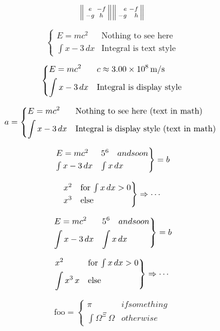 \documentclass{article}
\newcommand{\horz}{\noindent\makebox[\linewidth]{\rule{\paperwidth}{0.4pt}}}
\begin{document}
\[
\begin{Vsmallmatrix} e & -f \\ -g & h \end{Vsmallmatrix}
\begin{Vsmallmatrix*}[r] e & -f \\ -g & h \end{Vsmallmatrix*}
\]

\horz

\[
\begin{cases}
E = m c^2 & \text{Nothing to see here} \\
\int x-3\, dx & \text{Integral is text style}
\end{cases}
\]

\[
\begin{dcases}
E = m c^2 & c \approx 3.00\times 10^{8}\,\mathrm{m}/\mathrm{s} \\
\int x-3\, dx & \text{Integral is display style}
\end{dcases}
\]

\[
a= \begin{dcases*}
E = m c^2 & Nothing to see here (text in math) \\
\int x-3\, dx & Integral is display style (text in math)
\end{dcases*}
\]

\[
\begin{rcases}
E = m c^2 & 5^6 \quad and so on \\
\int x-3\, dx & \int x \, dx
\end{rcases} = b
\]

\[
\begin{rcases*}
x^2 & for $\int x\,dx>0$\\
x^3 & else
\end{rcases*} \Rightarrow \cdots
\]

\[
\begin{drcases}
E = m c^2 & 5^6 \quad and so on \\
\int x-3\, dx & \int x \, dx
\end{drcases} = b
\]

\[
\begin{drcases*}
x^2 & for $\int x\,dx>0$\\
\int x^3\,x & else
\end{drcases*} \Rightarrow \cdots
\]

\[
\text{foo} = \begin{cases*}
\pi & if something\\
\int \Omega^\Xi\,\Omega & otherwise
\end{cases*}
\]
\end{document}
